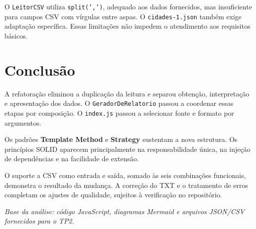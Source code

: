 \documentclass[12pt,a4paper]{article}
\begin{document}
O \texttt{LeitorCSV} utiliza \texttt{split(',')}, adequado aos dados fornecidos, mas insuficiente para campos CSV com vírgulas entre aspas. O \texttt{cidades-1.json} também exige adaptação específica. Essas limitações não impedem o atendimento aos requisitos básicos.

\section{Conclusão}
A refatoração eliminou a duplicação da leitura e separou obtenção, interpretação e apresentação dos dados. O \texttt{GeradorDeRelatorio} passou a coordenar essas etapas por composição. O \texttt{index.js} passou a selecionar fonte e formato por argumentos.

Os padrões \textbf{Template Method} e \textbf{Strategy} sustentam a nova estrutura. Os princípios SOLID aparecem principalmente na responsabilidade única, na injeção de dependências e na facilidade de extensão.

O suporte a CSV como entrada e saída, somado às seis combinações funcionais, demonstra o resultado da mudança. A correção do TXT e o tratamento de erros completam os ajustes de qualidade, sujeitos à verificação no repositório.

\emph{Base da análise: código JavaScript, diagramas Mermaid e arquivos JSON/CSV fornecidos para o TP2.}
\end{document}
